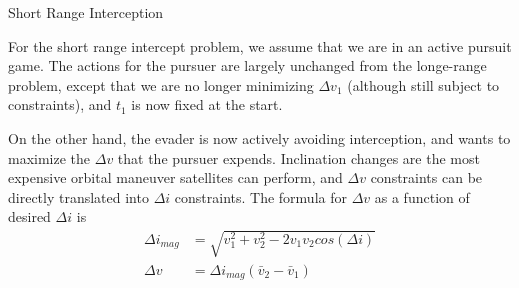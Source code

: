 \begin{frame}{Short Range Interception} 

    For the short range intercept problem, we assume that we are in an active pursuit game.  
% 
% 
% 
    The actions for the pursuer are largely unchanged from the longe-range problem, except that we are no longer minimizing $ \Delta v_1 $ (although still subject to constraints), and $ t_1 $ is now fixed at the start.  

    On the other hand, the evader is now actively avoiding interception, and wants to maximize the $ \Delta v $ that the pursuer expends. 
    Inclination changes are the most expensive orbital maneuver satellites can perform, and $ \Delta v $ constraints can be directly translated into $ \Delta i $ constraints. 
    The formula for $ \Delta v $ as a function of desired $ \Delta i $ is  
% 
    \begin{align}
        \Delta i_{mag} & = \sqrt{ v_1^2 + v_2^2 - 2 v_1 v_2 cos( \Delta i ) } \\ 
        \Delta v & = \Delta i_{mag} ( \bar{v}_2 - \bar{v}_1 ) 
    \end{align}

    
\end{frame} 

